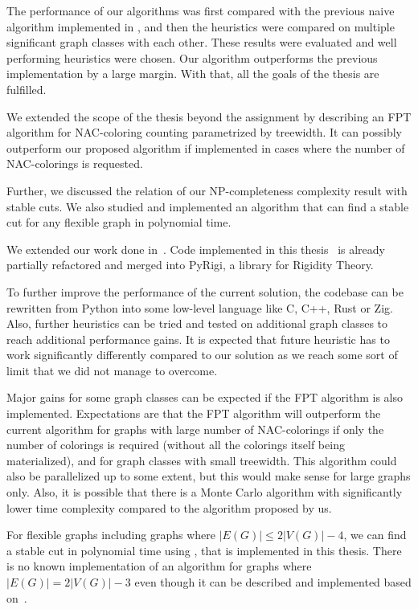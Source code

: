 The performance of our algorithms was
first compared with the previous naive algorithm implemented in \flexrilog{},
and then the heuristics were compared on multiple significant graph classes
with each other.
%
These results were evaluated and well performing heuristics were chosen.
Our algorithm outperforms the previous implementation by a large margin.
%
With that, all the goals of the thesis are fulfilled.

We extended the scope of the thesis beyond the assignment by
describing an FPT algorithm for NAC-coloring counting
parametrized by treewidth.
It can possibly outperform our proposed algorithm if implemented
in cases where the number of NAC-colorings is requested.

Further, we discussed the relation of our NP-completeness complexity result
with stable cuts.
We also studied and implemented an algorithm that can find
a stable cut for any flexible graph in polynomial time.

We extended our work done in~\cite{my_paper}.
Code implemented in this thesis~\cite{my_code} is already partially
refactored and merged into PyRigi, a library for Rigidity Theory.


To further improve the performance of the current solution, the codebase
can be rewritten from Python into some low-level language like C, C++, Rust or Zig.
Also, further heuristics can be tried
and tested on additional graph classes
to reach additional performance gains.
It is expected that future heuristic has to work significantly differently
compared to our solution as we reach some sort of limit
that we did not manage to overcome.

Major gains for some graph classes
can be expected if the FPT algorithm is also implemented.
Expectations are that the FPT algorithm will outperform the current algorithm
for graphs with large number of NAC-colorings if only the number of colorings
is required (without all the colorings itself being materialized),
and for graph classes with small treewidth.
This algorithm could also be parallelized up to some extent,
but this would make sense for large graphs only.
%
Also, it is possible that there is a Monte Carlo algorithm with significantly
lower time complexity compared to the algorithm proposed by us.

For flexible graphs including graphs where \( |E(G)| \le 2|V(G)| - 4 \),
we can find a stable cut in polynomial time using ,
that is implemented in this thesis.
There is no known implementation of an algorithm
for graphs where \( |E(G)| = 2|V(G)| - 3 \)
even though it can be described and implemented
based on~\cite{stable_cuts_2v_3,stable_cuts_2v_3_revisit}.

